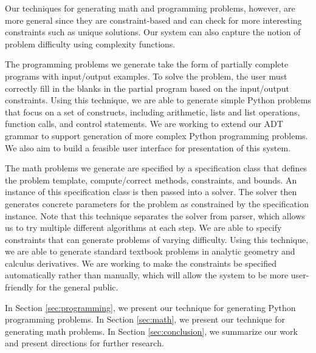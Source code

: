 Our techniques for generating math and programming problems, however, are more general since they are constraint-based and can check for more interesting constraints such as unique solutions. Our system can also capture the notion of problem difficulty using complexity functions. 

The programming problems we generate take the form of partially complete programs with input/output examples. To solve the problem, the user must correctly fill in the blanks in the partial program based on the input/output constraints. Using this technique, we are able to generate simple Python problems that focus on a set of constructs, including arithmetic, lists and list operations, function calls, and control statements. We are working to extend our ADT grammar to support generation of more complex Python programming problems. We also aim to build a feasible user interface for presentation of this system.

The math problems we generate are specified by a specification class that defines the problem template, compute/correct methods, constraints, and bounds. An instance of this specification class is then passed into a solver. The solver then generates concrete parameters for the problem as constrained by the specification instance. Note that this technique separates the solver from parser, which allows us to try multiple different algorithms at each step. We are able to specify constraints that can generate problems of varying difficulty. Using this technique, we are able to generate standard textbook problems in analytic geometry and calculus derivatives. We are working to make the constraints be specified automatically rather than manually, which will allow the system to be more user-friendly for the general public.

In Section \ref{sec:programming}, we present our technique for generating Python programming problems. In Section \ref{sec:math}, we present our technique for generating math problems. In Section \ref{sec:conclusion}, we summarize our work and present directions for further research.

